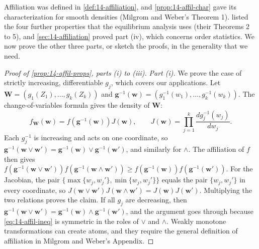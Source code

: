 Affiliation was defined in \cref{def:14-affiliation}, and \cref{prop:14-affil-char} gave its
characterization for smooth densities (Milgrom and Weber's Theorem 1).  listed the
four further properties that the equilibrium analysis uses (their Theorems 2 to 5), and
\cref{sec:14-affiliation} proved part (iv), which concerns order statistics. We now prove the other three
parts, or sketch the proofs, in the generality that we need.

\begin{proof}[Proof of \cref{prop:14-affil-props}, parts (i) to (iii)]
\emph{Part (i).} We prove the case of strictly increasing, differentiable $g_j$, which covers our applications.
Let $\bm W=(g_1(Z_1),\dots,g_k(Z_k))$ and $\bm g^{-1}(\bm w)=(g_1^{-1}(w_1),\dots,g_k^{-1}(w_k))$. The
change-of-variables formula gives the density of $\bm W$:
\begin{equation*}
  f_{\bm W}(\bm w)=f\left(\bm g^{-1}(\bm w)\right)J(\bm w),\qquad
  J(\bm w)=\prod_{j=1}^k\frac{d g_j^{-1}(w_j)}{dw_j}.
\end{equation*}
Each $g_j^{-1}$ is increasing and acts on one coordinate, so
$\bm g^{-1}(\bm w\vee\bm w')=\bm g^{-1}(\bm w)\vee\bm g^{-1}(\bm w')$, and similarly for $\wedge$. The
affiliation of $f$ then gives
$f(\bm g^{-1}(\bm w\vee\bm w'))f(\bm g^{-1}(\bm w\wedge\bm w'))\ge f(\bm g^{-1}(\bm w))f(\bm g^{-1}(\bm w'))$.
For the Jacobian, the pair $\{\max\{w_j,w_j'\},\min\{w_j,w_j'\}\}$ equals the pair $\{w_j,w_j'\}$ in every
coordinate, so $J(\bm w\vee\bm w')J(\bm w\wedge\bm w')=J(\bm w)J(\bm w')$. Multiplying the two relations
proves the claim. If all $g_j$ are decreasing, then $\bm g^{-1}(\bm w\vee\bm w')=\bm g^{-1}(\bm w)\wedge
\bm g^{-1}(\bm w')$, and the argument goes through because \eqref{eq:14-affil-ineq} is symmetric in the roles
of $\vee$ and $\wedge$. Weakly monotone transformations can create atoms, and they require the general
definition of affiliation in Milgrom and Weber's Appendix.


\end{proof}
